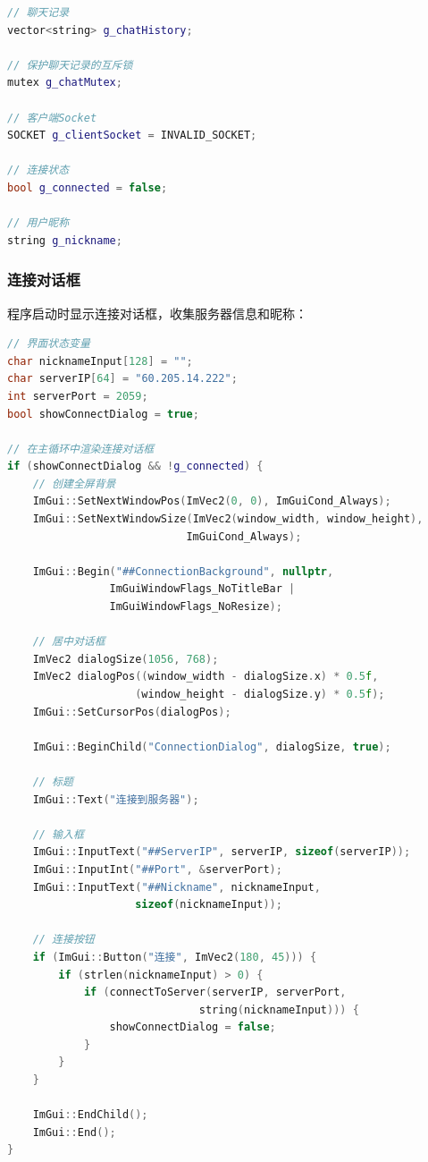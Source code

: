 \documentclass[12pt, a4paper]{article}
\begin{document}
\begin{lstlisting}[language=c++]
// 聊天记录
vector<string> g_chatHistory;

// 保护聊天记录的互斥锁
mutex g_chatMutex;

// 客户端Socket
SOCKET g_clientSocket = INVALID_SOCKET;

// 连接状态
bool g_connected = false;

// 用户昵称
string g_nickname;
\end{lstlisting}

\subsubsection{连接对话框}

程序启动时显示连接对话框，收集服务器信息和昵称：

\begin{lstlisting}[language=c++]
// 界面状态变量
char nicknameInput[128] = "";
char serverIP[64] = "60.205.14.222";
int serverPort = 2059;
bool showConnectDialog = true;

// 在主循环中渲染连接对话框
if (showConnectDialog && !g_connected) {
    // 创建全屏背景
    ImGui::SetNextWindowPos(ImVec2(0, 0), ImGuiCond_Always);
    ImGui::SetNextWindowSize(ImVec2(window_width, window_height), 
                            ImGuiCond_Always);
    
    ImGui::Begin("##ConnectionBackground", nullptr, 
                ImGuiWindowFlags_NoTitleBar | 
                ImGuiWindowFlags_NoResize);
    
    // 居中对话框
    ImVec2 dialogSize(1056, 768);
    ImVec2 dialogPos((window_width - dialogSize.x) * 0.5f, 
                    (window_height - dialogSize.y) * 0.5f);
    ImGui::SetCursorPos(dialogPos);
    
    ImGui::BeginChild("ConnectionDialog", dialogSize, true);
    
    // 标题
    ImGui::Text("连接到服务器");
    
    // 输入框
    ImGui::InputText("##ServerIP", serverIP, sizeof(serverIP));
    ImGui::InputInt("##Port", &serverPort);
    ImGui::InputText("##Nickname", nicknameInput, 
                    sizeof(nicknameInput));
    
    // 连接按钮
    if (ImGui::Button("连接", ImVec2(180, 45))) {
        if (strlen(nicknameInput) > 0) {
            if (connectToServer(serverIP, serverPort, 
                              string(nicknameInput))) {
                showConnectDialog = false;
            }
        }
    }
    
    ImGui::EndChild();
    ImGui::End();
}
\end{lstlisting}
\end{document}
